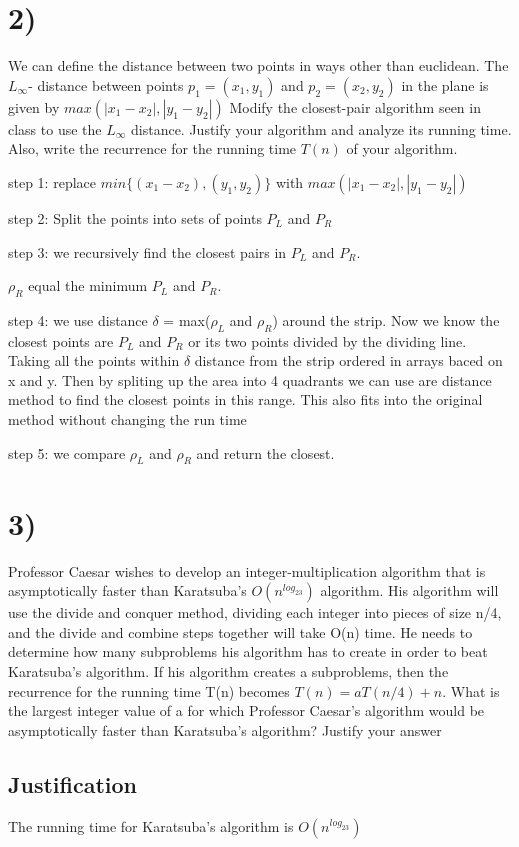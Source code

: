 \documentclass[12pt]{article}
\begin{document}
\section*{2)}
We can define the distance between two points in ways other than euclidean. The $L_\infty$- distance between points $p_1 = (x_1, y_1)$ and $p_2 = (x_2, y_2)$ in the plane is given by $max(|x_1-x_2|, |y_1 - y_2|)$  Modify the closest-pair algorithm seen in class to use the $L_\infty$ distance. Justify your algorithm and analyze its running time. Also, write the recurrence for the running time $T(n)$ of your algorithm.


step 1: replace $min \{ (x_1-x_2), (y_1, y_2) \}$ with $max(|x_1-x_2|, |y_1 - y_2|)$ 

step 2: Split the points into sets of points $P_L$ and $P_R$

step 3: we recursively find the closest pairs in $P_L$ and $P_R$. 

$\rho_R$ equal the minimum $P_L$ and $P_R$. 

step 4: we use distance $\delta$ = max($\rho_L$ and $\rho_R$) around the strip. Now we know the closest points are $P_L$ and $P_R$ or its two points divided by the dividing line. Taking all the points within $\delta$ distance from the strip ordered in arrays baced on x and y. Then by spliting up the area into 4 quadrants we can use are distance method to find the closest points in this range. This also fits into the original method without changing the run time  

step 5:  we compare $\rho_L$ and $\rho_R$ and return the closest.

\section*{3)}
 Professor Caesar wishes to develop an integer-multiplication algorithm that is asymptotically faster than Karatsuba’s $O(n^{log_23})$ algorithm. His algorithm will use the divide and conquer method, dividing each integer into pieces of size n/4, and the divide and combine steps together will take O(n) time. He needs to determine how many subproblems his algorithm has to create in order to beat Karatsuba’s algorithm. If his algorithm creates a subproblems, then the recurrence for the running time T(n) becomes $T(n) = aT(n/4) + n$. What is the largest integer value of a for which Professor Caesar’s algorithm would be asymptotically faster than Karatsuba’s algorithm? Justify your answer
 
 \subsection{Justification}
 The running time for Karatsuba’s algorithm is $O(n^{log_23})$
 	 
\end{document}
